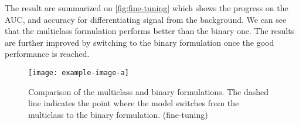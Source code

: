 The result are summarized on \autoref{fig:fine-tuning} which shows the progress on the AUC, and accuracy for
differentiating signal from the background.  We can see that the multiclass formulation performs better than the binary
one. The results are further improved by switching to the binary formulation once the good performance is reached.

\begin{figure}[htbp]
    \centering
    \texttt{[image: example-image-a]}
    \caption{Comparison of the multiclass and binary formulations. The dashed line indicates the point where the model
        switches from the multiclass to the binary formulation. (fine-tuning)}
    \label{fig:fine-tuning}
\end{figure}
